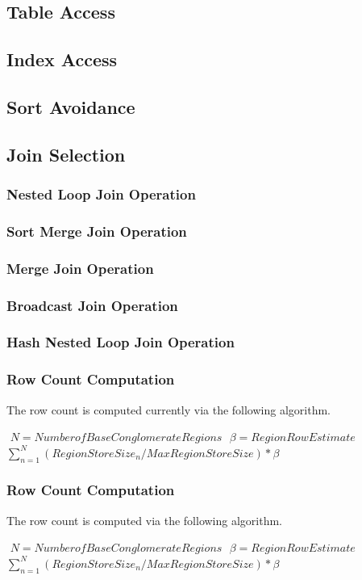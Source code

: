\subsection{Table Access}

\subsection{Index Access}

\subsection{Sort Avoidance}

\subsection{Join Selection}

\subsubsection{Nested Loop Join Operation}

\subsubsection{Sort Merge Join Operation}

\subsubsection{Merge Join Operation}

\subsubsection{Broadcast Join Operation}

\subsubsection{Hash Nested Loop Join Operation}


\subsubsection{Row Count Computation}

The row count is computed currently via the following algorithm.

$ $
$ N=Number of Base Conglomerate Regions$
$ $
$ \beta=Region Row Estimate $
$ $
$\sum_{n=1}^{N}(RegionStoreSize_n/MaxRegionStoreSize)*\beta$
$ $

\subsubsection{Row Count Computation}

The row count is computed via the following algorithm.

$ $
$ N=Number of Base Conglomerate Regions$
$ $
$ \beta=Region Row Estimate $
$ $
$\sum_{n=1}^{N}(RegionStoreSize_n/MaxRegionStoreSize)*\beta$
$ $


